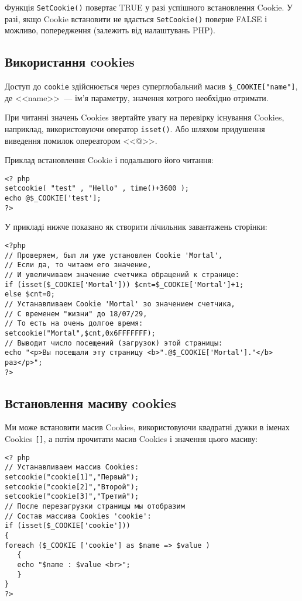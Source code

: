Функція \verb'SetCookie()' повертає TRUE у разі успішного встановлення Cookie. У разі, якщо Cookie встановити не вдається \verb'SetCookie()' поверне FALSE і можливо, попередження (залежить від налаштувань PHP). 


\subsection*{Використання cookies}

Доступ до \verb'cookie' здійснюється через суперглобальний масив \verb'$_COOKIE["name"]', де <<name>>~--- ім'я параметру, значення котрого необхідно отримати.

При читанні значень Cookies звертайте увагу на перевірку існування Cookies, наприклад, використовуючи оператор \verb'isset()'. Або шляхом придушення виведення помилок опереатором <<@>>.

Приклад встановлення Cookie і подальшого його читання:
\begin{verbatim}
<? php
setcookie( "test" , "Hello" , time()+3600 );
echo @$_COOKIE['test'];
?>
\end{verbatim}

У прикладі нижче показано як створити лічильник завантажень сторінки:
\begin{lstlisting}[caption=Лічильник завантажень сторінки]
<?php
// Проверяем, был ли уже установлен Cookie 'Mortal',
// Если да, то читаем его значение,
// И увеличиваем значение счетчика обращений к странице:
if (isset($_COOKIE['Mortal'])) $cnt=$_COOKIE['Mortal']+1;
else $cnt=0;
// Устанавливаем Cookie 'Mortal' зо значением счетчика,
// С временем "жизни" до 18/07/29,
// То есть на очень долгое время:
setcookie("Mortal",$cnt,0x6FFFFFFF);
// Выводит число посещений (загрузок) этой страницы:
echo "<p>Вы посещали эту страницу <b>".@$_COOKIE['Mortal']."</b> раз</p>";
?>
\end{lstlisting}

\subsection*{Встановлення масиву cookies}

Ми може встановити масив Cookies, використовуючи квадратні дужки в іменах Cookies \verb'[]', а потім прочитати масив Cookies і значення цього масиву:

\begin{lstlisting}[caption=Масив Cookies]
 <? php
// Устанавливаем массив Cookies:
setcookie("cookie[1]","Первый");
setcookie("cookie[2]","Второй");
setcookie("cookie[3]","Третий");
// После перезагрузки страницы мы отобразим
// Состав массива Cookies 'cookie':
if (isset($_COOKIE['cookie']))   
{
foreach ($_COOKIE ['cookie'] as $name => $value )   
   {
   echo "$name : $value <br>";
   }
}
?> 
\end{lstlisting}

